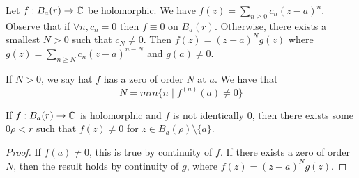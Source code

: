 Let $f : B_a(r) \rightarrow \mathbb{C}$ be holomorphic. We have $f(z) = \sum_{n \geq 0} c_n(z-a)^n$.
Observe that if $\forall n, c_n  = 0$ then $f \equiv 0$ on $B_a(r)$.
Otherwise, there exists a smallest $N > 0$ such that $c_N \neq 0$.
Then $f(z) = (z - a)^N g(z)$ where $g(z) = \sum_{n \geq N}c_n(z-a)^{n-N}$ and $g(a) \neq 0$.

\begin{definition}
  If $N > 0$, we say hat $f$ has a zero of order $N$ at $a$. We have that
\[
N = min \{ n \mid f^{(n)}(a) \neq 0 \}
\]
\end{definition}

\begin{lemma}
  If $f : B_a(r) \rightarrow \mathbb{C}$ is holomorphic and $f$ is not identically $0$, then there exists some $0 \rho < r$ such that $f(z) \neq 0$ for $z \in B_a(\rho) \setminus \{ a \}$.
\end{lemma}

\begin{proof}
  If $f(a) \neq 0$, this is true by continuity of $f$.
  If there exists a zero of order $N$, then the result holds by continuity of $g$, where $f(z) = (z-a)^N g(z)$.
\end{proof}

